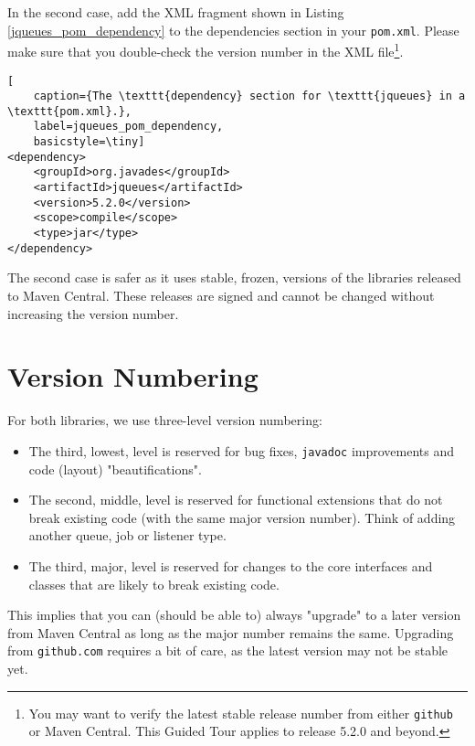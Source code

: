 In the second case,
  add the XML fragment shown in Listing \ref{jqueues_pom_dependency}
  to the dependencies
  section in your \lstinline|pom.xml|.
Please make sure that you double-check the version number in the XML file\footnote{
You may want to verify the latest stable release number
from either \lstinline|github| or Maven Central.
This Guided Tour applies to release 5.2.0 and beyond.}. 
\begin{lstfloat}
\begin{lstlisting}[
	caption={The \texttt{dependency} section for \texttt{jqueues} in a \texttt{pom.xml}.},
	label=jqueues_pom_dependency,
	basicstyle=\tiny]
<dependency>
	<groupId>org.javades</groupId>
	<artifactId>jqueues</artifactId>
	<version>5.2.0</version>
	<scope>compile</scope>
	<type>jar</type>
</dependency>
\end{lstlisting}
\end{lstfloat}
The second case is safer as it uses stable, frozen, versions
  of the libraries released to Maven Central.
These releases are signed and cannot be changed without
  increasing the version number.
  
\section{Version Numbering}

For both libraries, we use three-level version numbering:
\begin{itemize}
	\item The third, lowest, level is reserved for bug fixes,
	        \lstinline|javadoc| improvements
	        and code (layout) "beautifications".
	\item The second, middle, level is reserved for functional extensions
	        that do not break existing code (with the same major version number).
	      Think of adding another queue, job or listener type.
	\item The third, major, level is reserved for changes to the core
	        interfaces and classes that are likely to break existing code.
\end{itemize}
This implies that you can (should be able to) always "upgrade" to a later version
  from Maven Central
  as long as the major number remains the same.
Upgrading from \lstinline|github.com| requires a bit of care,
  as the latest version may not be stable yet.
  
